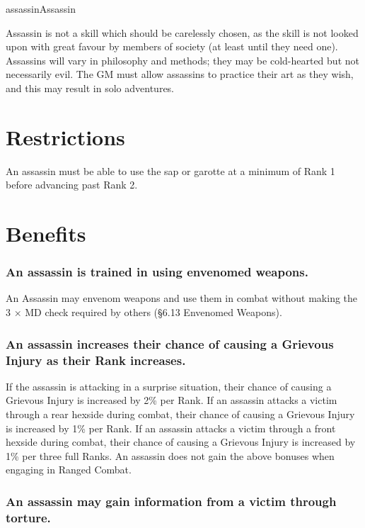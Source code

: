 \begin{Skill}{assassin}{Assassin}

Assassin is not a skill which should be carelessly chosen, as the
skill is not looked upon with great favour by members of society (at
least until they need one).  Assassins will vary in philosophy and
methods; they may be cold-hearted but not necessarily evil.  The GM
must allow assassins to practice their art as they wish, and this may
result in solo adventures.

\section{Restrictions}

An assassin must be able to use the sap or garotte at a minimum of
Rank 1 before advancing past Rank 2.

\section{Benefits}

\subsubsection{An assassin is trained in using envenomed weapons.}

An Assassin may envenom weapons and use them in combat without making
the 3 × MD check required by others (§6.13 Envenomed Weapons).

\subsubsection{An assassin increases their chance of causing a Grievous Injury as
their Rank increases.}

If the assassin is attacking in a surprise situation, their chance of
causing a Grievous Injury is increased by 2\% per Rank.  If an
assassin attacks a victim through a rear hexside during combat, their
chance of causing a Grievous Injury is increased by 1\% per Rank.  If
an assassin attacks a victim through a front hexside during combat,
their chance of causing a Grievous Injury is increased by 1\% per
three full Ranks. An assassin does not gain the above bonuses when
engaging in Ranged Combat.


\subsubsection{An assassin may gain information from a victim through torture.}


\end{Skill}
